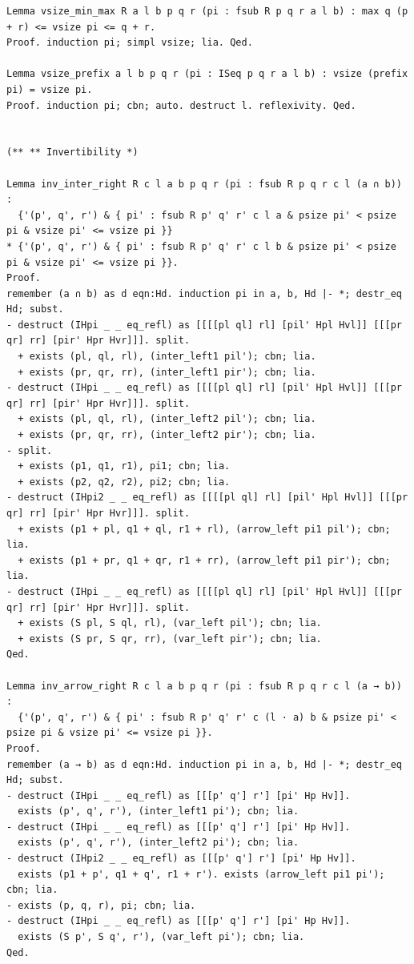 \begin{lstlisting}
Lemma vsize_min_max R a l b p q r (pi : fsub R p q r a l b) : max q (p + r) <= vsize pi <= q + r.
Proof. induction pi; simpl vsize; lia. Qed.

Lemma vsize_prefix a l b p q r (pi : ISeq p q r a l b) : vsize (prefix pi) = vsize pi.
Proof. induction pi; cbn; auto. destruct l. reflexivity. Qed.


(** ** Invertibility *)

Lemma inv_inter_right R c l a b p q r (pi : fsub R p q r c l (a ∩ b)) :
  {'(p', q', r') & { pi' : fsub R p' q' r' c l a & psize pi' < psize pi & vsize pi' <= vsize pi }}
* {'(p', q', r') & { pi' : fsub R p' q' r' c l b & psize pi' < psize pi & vsize pi' <= vsize pi }}.
Proof.
remember (a ∩ b) as d eqn:Hd. induction pi in a, b, Hd |- *; destr_eq Hd; subst.
- destruct (IHpi _ _ eq_refl) as [[[[pl ql] rl] [pil' Hpl Hvl]] [[[pr qr] rr] [pir' Hpr Hvr]]]. split.
  + exists (pl, ql, rl), (inter_left1 pil'); cbn; lia.
  + exists (pr, qr, rr), (inter_left1 pir'); cbn; lia.
- destruct (IHpi _ _ eq_refl) as [[[[pl ql] rl] [pil' Hpl Hvl]] [[[pr qr] rr] [pir' Hpr Hvr]]]. split.
  + exists (pl, ql, rl), (inter_left2 pil'); cbn; lia.
  + exists (pr, qr, rr), (inter_left2 pir'); cbn; lia.
- split.
  + exists (p1, q1, r1), pi1; cbn; lia.
  + exists (p2, q2, r2), pi2; cbn; lia.
- destruct (IHpi2 _ _ eq_refl) as [[[[pl ql] rl] [pil' Hpl Hvl]] [[[pr qr] rr] [pir' Hpr Hvr]]]. split.
  + exists (p1 + pl, q1 + ql, r1 + rl), (arrow_left pi1 pil'); cbn; lia.
  + exists (p1 + pr, q1 + qr, r1 + rr), (arrow_left pi1 pir'); cbn; lia.
- destruct (IHpi _ _ eq_refl) as [[[[pl ql] rl] [pil' Hpl Hvl]] [[[pr qr] rr] [pir' Hpr Hvr]]]. split.
  + exists (S pl, S ql, rl), (var_left pil'); cbn; lia.
  + exists (S pr, S qr, rr), (var_left pir'); cbn; lia.
Qed.

Lemma inv_arrow_right R c l a b p q r (pi : fsub R p q r c l (a → b)) :
  {'(p', q', r') & { pi' : fsub R p' q' r' c (l · a) b & psize pi' < psize pi & vsize pi' <= vsize pi }}.
Proof.
remember (a → b) as d eqn:Hd. induction pi in a, b, Hd |- *; destr_eq Hd; subst.
- destruct (IHpi _ _ eq_refl) as [[[p' q'] r'] [pi' Hp Hv]].
  exists (p', q', r'), (inter_left1 pi'); cbn; lia.
- destruct (IHpi _ _ eq_refl) as [[[p' q'] r'] [pi' Hp Hv]].
  exists (p', q', r'), (inter_left2 pi'); cbn; lia.
- destruct (IHpi2 _ _ eq_refl) as [[[p' q'] r'] [pi' Hp Hv]].
  exists (p1 + p', q1 + q', r1 + r'). exists (arrow_left pi1 pi'); cbn; lia.
- exists (p, q, r), pi; cbn; lia.
- destruct (IHpi _ _ eq_refl) as [[[p' q'] r'] [pi' Hp Hv]].
  exists (S p', S q', r'), (var_left pi'); cbn; lia.
Qed.


\end{lstlisting}
